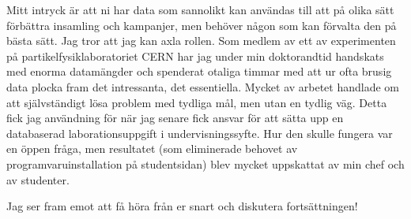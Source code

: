 \documentclass[11pt, a4paper]{../awesome-cv} %
\begin{document}
\begin{cvletter}
Mitt intryck {\"a}r att ni har data som sannolikt kan anv{\"a}ndas till att p{\aa} olika s{\"a}tt f{\"o}rb{\"a}ttra insamling och kampanjer, men beh{\"o}ver n{\aa}gon som kan f{\"o}rvalta den p{\aa} b{\"a}sta s{\"a}tt. %
Jag tror att jag kan axla rollen.
Som medlem av ett av experimenten på partikelfysiklaboratoriet CERN har jag under min doktorandtid handskats med enorma datamängder och spenderat otaliga timmar med att ur ofta brusig data plocka fram det intressanta, det essentiella. %
Mycket av arbetet handlade om att sj{\"a}lvst{\"a}ndigt l{\"o}sa problem med tydliga m{\aa}l, men utan en tydlig v{\"a}g.
Detta fick jag användning för när jag senare fick ansvar för att s{\"a}tta upp en databaserad laborationsuppgift i undervisningssyfte. 
Hur den skulle fungera var en öppen fråga, men resultatet (som eliminerade behovet av programvaruinstallation på studentsidan) blev mycket uppskattat av min chef och av studenter.



Jag ser fram emot att f{\aa} h{\"o}ra fr{\aa}n er snart och diskutera forts{\"a}ttningen!

%
%
%
%


\end{cvletter}
\end{document}
